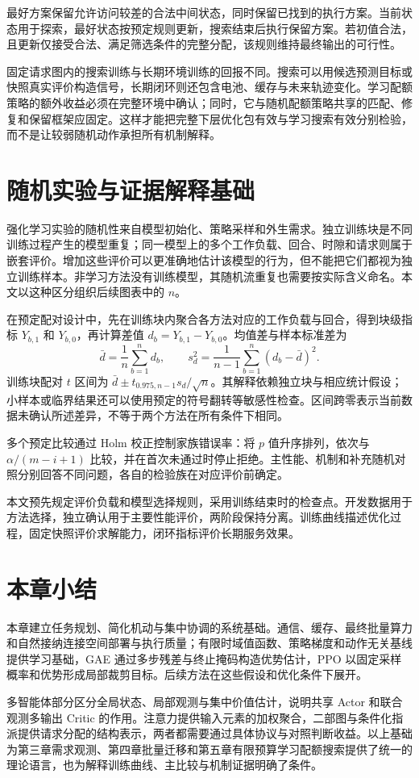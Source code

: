 最好方案保留允许访问较差的合法中间状态，同时保留已找到的执行方案。当前状态用于探索，最好状态按预定规则更新，搜索结束后执行保留方案。若初值合法，且更新仅接受合法、满足筛选条件的完整分配，该规则维持最终输出的可行性。

固定请求图内的搜索训练与长期环境训练的回报不同。搜索可以用候选预测目标或快照真实评价构造信号，长期闭环则还包含电池、缓存与未来轨迹变化。学习配额策略的额外收益必须在完整环境中确认；同时，它与随机配额策略共享的匹配、修复和保留框架应固定。这样才能把完整下层优化包有效与学习搜索有效分别检验，而不是让较弱随机动作承担所有机制解释。

\section{随机实验与证据解释基础}
\label{sec:ch2-statistical-evidence}

强化学习实验的随机性来自模型初始化、策略采样和外生需求。独立训练块是不同训练过程产生的模型重复；同一模型上的多个工作负载、回合、时隙和请求则属于嵌套评价。增加这些评价可以更准确地估计该模型的行为，但不能把它们都视为独立训练样本。非学习方法没有训练模型，其随机流重复也需要按实际含义命名。本文以这种区分组织后续图表中的 $n$。

在预定配对设计中，先在训练块内聚合各方法对应的工作负载与回合，得到块级指标 $Y_{b,1}$ 和 $Y_{b,0}$，再计算差值 $d_b=Y_{b,1}-Y_{b,0}$。均值差与样本标准差为
\begin{equation}
    \bar d=\frac{1}{n}\sum_{b=1}^{n}d_b,\qquad
    s_d^2=\frac{1}{n-1}\sum_{b=1}^{n}(d_b-\bar d)^2.
    \label{eq:ch2-paired-difference}
\end{equation}
训练块配对 $t$ 区间为 $\bar d\pm t_{0.975,n-1}s_d/\sqrt n$。其解释依赖独立块与相应统计假设；小样本或临界结果还可以使用预定的符号翻转等敏感性检查。区间跨零表示当前数据未确认所述差异，不等于两个方法在所有条件下相同。

多个预定比较通过 Holm 校正控制家族错误率：将 $p$ 值升序排列，依次与 $\alpha/(m-i+1)$ 比较，并在首次未通过时停止拒绝。主性能、机制和补充随机对照分别回答不同问题，各自的检验族在对应评价前确定。

本文预先规定评价负载和模型选择规则，采用训练结束时的检查点。开发数据用于方法选择，独立确认用于主要性能评价，两阶段保持分离。训练曲线描述优化过程，固定快照评价求解能力，闭环指标评价长期服务效果。

\section{本章小结}
\label{sec:summary-chap02}

本章建立任务规划、简化机动与集中协调的系统基础。通信、缓存、最终批量算力和自然接纳连接空间部署与执行质量；有限时域值函数、策略梯度和动作无关基线提供学习基础，GAE 通过多步残差与终止掩码构造优势估计，PPO 以固定采样概率和优势形成局部裁剪目标。后续方法在这些假设和优化条件下展开。

多智能体部分区分全局状态、局部观测与集中价值估计，说明共享 Actor 和联合观测多输出 Critic 的作用。注意力提供输入元素的加权聚合，二部图与条件化指派提供请求分配的结构表示，两者都需要通过具体协议与对照判断收益。以上基础为第三章需求观测、第四章批量迁移和第五章有限预算学习配额搜索提供了统一的理论语言，也为解释训练曲线、主比较与机制证据明确了条件。
